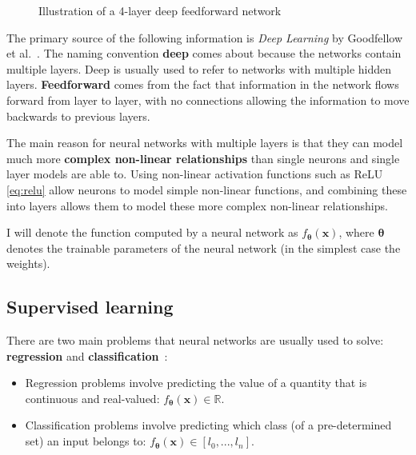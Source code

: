 \documentclass[12pt,a4paper,twoside,openright]{report}
\renewcommand{\vec}[1]{\bm{#1}}
\begin{document}
\begin{figure}[H]
\begin{center}
      \caption{Illustration of a 4-layer deep feedforward network}
      \label{fig:illustration_deep_network}
  \end{center}
\end{figure}

The primary source of the following information is \textit{Deep Learning} by Goodfellow et al.~\cite{Goodfellow-et-al-2016}. 
The naming convention \textbf{deep} comes about because the networks contain multiple layers. Deep is usually used to refer to networks 
with multiple hidden layers. \textbf{Feedforward} comes from the fact that information 
in the network flows forward from layer to layer, with no connections allowing the information to move backwards to previous layers.

The main reason for neural networks with multiple layers is that they can model much more \textbf{complex non-linear relationships} than single 
neurons and single layer models are able to. Using non-linear activation functions such as ReLU \eqref{eq:relu} allow neurons to model simple 
non-linear functions, and combining these into layers allows them to model these more complex non-linear relationships.

I will denote the function computed by a neural network as $f_{\vec{\theta}}(\vec{x})$, where $\vec{\theta}$ denotes the trainable parameters of the neural
network (in the simplest case the weights).

\subsection{Supervised learning}

There are two main problems that neural networks are usually used to solve: \textbf{regression} and \textbf{classification}~\cite{ML_Bayes}:
\begin{itemize}
  \item Regression problems involve predicting the value of a quantity that is continuous and real-valued: $f_{\vec{\theta}}(\vec{x}) \in \mathbb{R}$. 
  \item Classification problems involve predicting which class (of a pre-determined set) an input belongs to: $f_{\vec{\theta}}(\vec{x}) \in [l_0,...,l_n]$.
\end{itemize}
\end{document}
